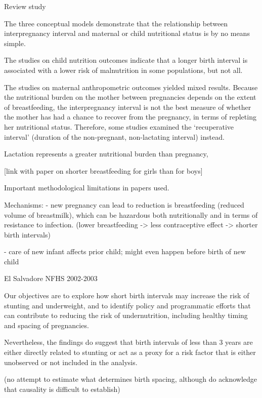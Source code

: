 
\citet{Dewey2007}

Review study

The three conceptual models demonstrate that the relationship between
interpregnancy interval and maternal or child nutritional status is by
no means simple.

The studies on child nutrition outcomes indicate that a longer birth
interval is associated with a lower risk of malnutrition in some
populations, but not all.

The studies on maternal anthropometric outcomes yielded mixed results.
Because the nutritional burden on the mother between pregnancies depends
on the extent of breastfeeding, the interpregnancy interval is not the
best measure of whether the mother has had a chance to recover from the
pregnancy, in terms of repleting her nutritional status. Therefore, some
studies examined the ‘recuperative interval’ (duration of the
non-pregnant, non-lactating interval) instead.

Lactation represents a greater nutritional burden than pregnancy,

[link with paper on shorter breastfeeding for girls than for boys]

Important methodological limitations in papers used.

Mechanisms: 
- new pregnancy can lead to reduction is breastfeeding (reduced volume of breastmilk), which
can be hazardous both nutritionally and in terms of resistance to infection.
(lower breastfeeding -> less contraceptive effect -> shorter birth intervals)

- care of new infant affects prior child; might even happen before birth of new child

\citet{Gribble2009}

El Salvadore NFHS 2002-2003

Our objectives are to explore how short birth intervals may increase the
risk of stunting and underweight, and to identify policy and
programmatic efforts that can contribute to reducing the risk of
undernutrition, including healthy timing and spacing of pregnancies.

Nevertheless, the ﬁndings do suggest that birth intervals of less than 3
years are either directly related to stunting or act as a proxy for a
risk factor that is either unobserved or not included in the analysis.

(no attempt to estimate what determines birth spacing, although do acknowledge that
causality is difficult to establish)

